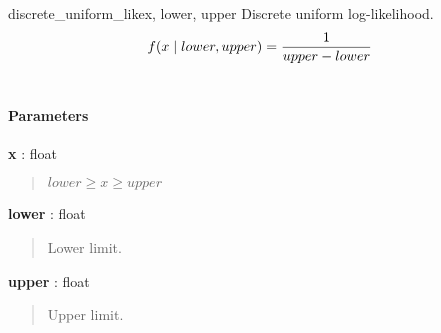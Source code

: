 \hypertarget{pymc.distributions.discrete_uniform_like}{}
\begin{funcdesc}{discrete\_uniform\_like}{x, lower, upper}
Discrete uniform log-likelihood.
\begin{gather}
\begin{split}f(x \mid lower, upper) = \frac{1}{upper-lower}\end{split}\notag\\\begin{split}\end{split}\notag
\end{gather}
\paragraph{Parameters}
\begin{paramlist}
\item[] \textbf{x} : float
\begin{quote}

$lower \geq x \geq upper$
\end{quote}

\item[] \textbf{lower} : float
\begin{quote}

Lower limit.
\end{quote}

\item[] \textbf{upper} : float
\begin{quote}

Upper limit.
\end{quote}
\end{paramlist}
\end{funcdesc}



